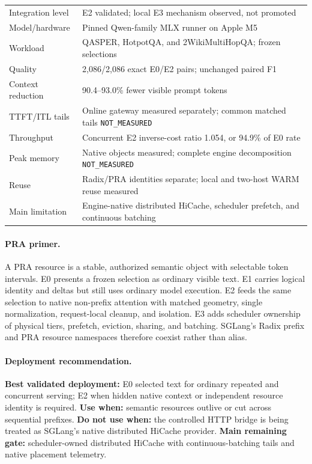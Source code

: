 \documentclass[10pt]{article}
\begin{document}
\begin{center}
\small
\begin{tabularx}{0.96\linewidth}{lX}
\toprule
Integration level & E2 validated; local E3 mechanism observed, not promoted\\
Model/hardware & Pinned Qwen-family MLX runner on Apple M5\\
Workload & QASPER, HotpotQA, and 2WikiMultiHopQA; frozen selections\\
Quality & 2,086/2,086 exact E0/E2 pairs; unchanged paired F1\\
Context reduction & 90.4--93.0\% fewer visible prompt tokens\\
TTFT/ITL tails & Online gateway measured separately; common matched tails \texttt{NOT\_MEASURED}\\
Throughput & Concurrent E2 inverse-cost ratio 1.054, or 94.9\% of E0 rate\\
Peak memory & Native objects measured; complete engine decomposition \texttt{NOT\_MEASURED}\\
Reuse & Radix/PRA identities separate; local and two-host WARM reuse measured\\
Main limitation & Engine-native distributed HiCache, scheduler prefetch, and continuous batching\\
\bottomrule
\end{tabularx}
\end{center}

\paragraph{PRA primer.}
A PRA resource is a stable, authorized semantic object with selectable token
intervals. E0 presents a frozen selection as ordinary visible text. E1 carries
logical identity and deltas but still uses ordinary model execution. E2 feeds
the same selection to native non-prefix attention with matched geometry,
single normalization, request-local cleanup, and isolation. E3 adds scheduler
ownership of physical tiers, prefetch, eviction, sharing, and batching. SGLang's
Radix prefix and PRA resource namespaces therefore coexist rather than alias.

\paragraph{Deployment recommendation.}
\textbf{Best validated deployment:} E0 selected text for ordinary repeated and
concurrent serving; E2 when hidden native context or independent resource
identity is required. \textbf{Use when:} semantic resources outlive or cut
across sequential prefixes. \textbf{Do not use when:} the controlled HTTP
bridge is being treated as SGLang's native distributed HiCache provider.
\textbf{Main remaining gate:} scheduler-owned distributed HiCache with
continuous-batching tails and native placement telemetry.
\end{document}

